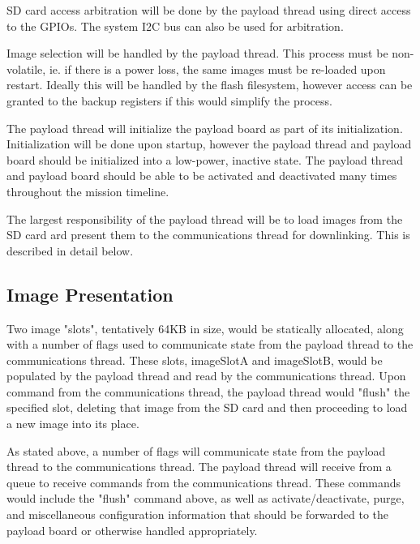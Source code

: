 \documentclass{article}
\begin{document}
SD card access arbitration will be done by the payload thread using direct access
to the GPIOs. The system I2C bus can also be used for arbitration.

Image selection will be handled by the payload thread. This process must be
non-volatile, ie. if there is a power loss, the same images must be re-loaded
upon restart. Ideally this will be handled by the flash filesystem, however
access can be granted to the backup registers if this would simplify the
process.

The payload thread will initialize the payload board as part of its initialization.
Initialization will be done upon startup, however the payload thread and payload
board should be initialized into a low-power, inactive state. The payload thread
and payload board should be able to be activated and deactivated many times
throughout the mission timeline.

The largest responsibility of the payload thread will be to load images from 
the SD card ard present them to the communications thread for downlinking. This
is described in detail below.

\subsection{Image Presentation}
Two image "slots", tentatively 64KB in size, would be statically allocated,
along with a number of flags used to communicate state from the payload thread
to the communications thread. These slots, imageSlotA and imageSlotB, would be
populated by the payload thread and read by the communications thread. Upon
command from the communications thread, the payload thread would "flush" the
specified slot, deleting that image from the SD card and then proceeding to
load a new image into its place.

As stated above, a number of flags will communicate state from the payload
thread to the communications thread. The payload thread will receive from a 
queue to receive commands from the communications thread. These commands would
include the "flush" command above, as well as activate/deactivate, purge, and
miscellaneous configuration information that should be forwarded to the payload
board or otherwise handled appropriately.
\end{document}
